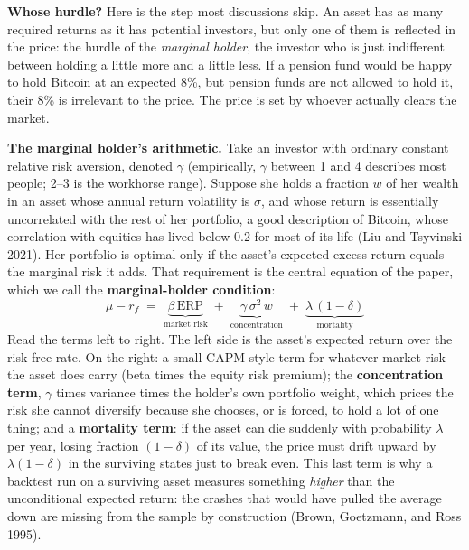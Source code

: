 \documentclass[11pt]{article}
\begin{document}
\textbf{Whose hurdle?} Here is the step most discussions skip. An asset has as many required returns as it has potential investors, but only one of them is reflected in the price: the hurdle of the \emph{marginal holder}, the investor who is just indifferent between holding a little more and a little less. If a pension fund would be happy to hold Bitcoin at an expected 8\%, but pension funds are not allowed to hold it, their 8\% is irrelevant to the price. The price is set by whoever actually clears the market.

\textbf{The marginal holder's arithmetic.} Take an investor with ordinary constant relative risk aversion, denoted $\gamma$ (empirically, $\gamma$ between 1 and 4 describes most people; 2--3 is the workhorse range). Suppose she holds a fraction $w$ of her wealth in an asset whose annual return volatility is $\sigma$, and whose return is essentially uncorrelated with the rest of her portfolio, a good description of Bitcoin, whose correlation with equities has lived below 0.2 for most of its life (Liu and Tsyvinski 2021). Her portfolio is optimal only if the asset's expected excess return equals the marginal risk it adds. That requirement is the central equation of the paper, which we call the \textbf{marginal-holder condition}:
\begin{equation}
\boxed{\;\mu - r_f \;=\; \underbrace{\beta\,\mathrm{ERP}}_{\text{market risk}} \;+\; \underbrace{\gamma\,\sigma^2\,w}_{\text{concentration}} \;+\; \underbrace{\lambda\,(1-\delta)}_{\text{mortality}}\;}
\label{eq:foc}
\end{equation}
Read the terms left to right. The left side is the asset's expected return over the risk-free rate. On the right: a small CAPM-style term for whatever market risk the asset does carry (beta times the equity risk premium); the \textbf{concentration term}, $\gamma$ times variance times the holder's own portfolio weight, which prices the risk she cannot diversify because she chooses, or is forced, to hold a lot of one thing; and a \textbf{mortality term}: if the asset can die suddenly with probability $\lambda$ per year, losing fraction $(1-\delta)$ of its value, the price must drift upward by $\lambda(1-\delta)$ in the surviving states just to break even. This last term is why a backtest run on a surviving asset measures something \emph{higher} than the unconditional expected return: the crashes that would have pulled the average down are missing from the sample by construction (Brown, Goetzmann, and Ross 1995).
\end{document}

